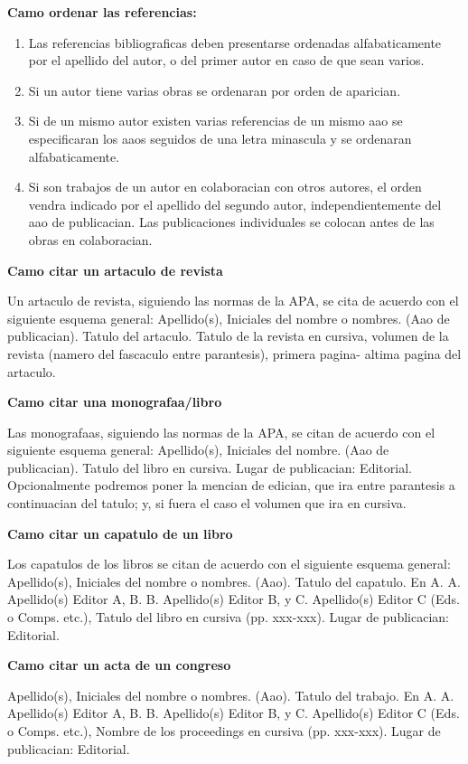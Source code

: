\documentclass[spanish,12pt, a4paper,twoside]{paper}
\begin{document}
\bigskip
{\bf Camo ordenar las referencias:}
\begin{enumerate}
\item Las referencias bibliograficas deben presentarse ordenadas alfabaticamente por el apellido del autor, o del primer autor en caso de que sean varios.
\item Si un autor tiene varias obras se ordenaran por orden de aparician.
\item Si de un mismo autor existen varias referencias de un mismo aao se especificaran los aaos seguidos de una letra minascula y se ordenaran alfabaticamente.
\item Si son trabajos de un autor en colaboracian con otros autores, el orden vendra indicado por el apellido del segundo autor, independientemente del aao de publicacian. Las publicaciones individuales se colocan antes de las obras en colaboracian.
\end{enumerate}

\bigskip
{\bf Camo citar un artaculo de revista}

Un artaculo de revista, siguiendo las normas de la APA, se cita de acuerdo con el siguiente esquema general:
Apellido(s), Iniciales del nombre o nombres. (Aao de publicacian). Tatulo del artaculo. Tatulo de la revista en cursiva, volumen de la revista (namero del fascaculo entre parantesis), primera pagina- altima pagina del artaculo.

\bigskip
{\bf Camo citar una monografaa/libro}

Las monografaas, siguiendo las normas de la APA, se citan de acuerdo con el siguiente esquema general:
Apellido(s), Iniciales del nombre. (Aao de publicacian). Tatulo del libro en cursiva. Lugar de publicacian: Editorial.
Opcionalmente podremos poner la mencian de edician, que ira entre parantesis a continuacian del tatulo; y, si fuera el caso el volumen que ira en cursiva.

\bigskip
{\bf Camo citar un capatulo de un libro}

Los capatulos de los libros se citan de acuerdo con el siguiente esquema general:
Apellido(s), Iniciales del nombre o nombres. (Aao). Tatulo del capatulo. En A. A. Apellido(s) Editor A, B. B. Apellido(s) Editor B, y C. Apellido(s) Editor C (Eds. o Comps. etc.), Tatulo del libro en cursiva (pp. xxx-xxx). Lugar de publicacian: Editorial.

\bigskip
{\bf Camo citar un acta de un congreso}

Apellido(s), Iniciales del nombre o nombres. (Aao). Tatulo del trabajo. En A. A. Apellido(s) Editor A, B. B. Apellido(s) Editor B, y C. Apellido(s) Editor C (Eds. o Comps. etc.), Nombre de los proceedings en cursiva (pp. xxx-xxx). Lugar de publicacian: Editorial.
\end{document}
